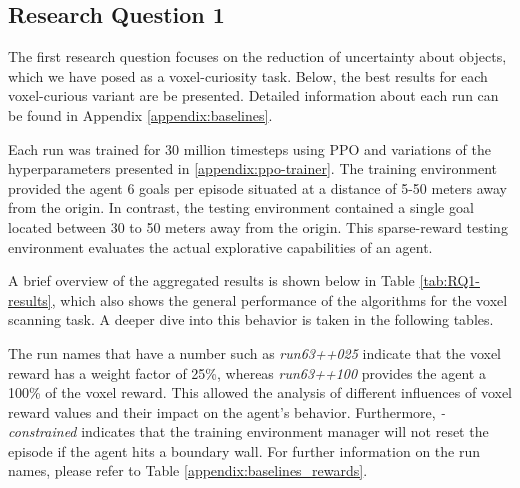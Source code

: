
\subsection{Research Question 1}\label{chap:4:results-RQ1}

The first research question focuses on the reduction of uncertainty about objects, which we have posed as a voxel-curiosity task. Below, the best results for each voxel-curious variant are be presented. Detailed information about each run can be found in Appendix \ref{appendix:baselines}.

Each run was trained for 30 million timesteps using PPO and variations of the hyperparameters presented in \ref{appendix:ppo-trainer}. The training environment provided the agent 6 goals per episode situated at a distance of 5-50 meters away from the origin. In contrast, the testing environment contained a single goal located between 30 to 50 meters away from the origin. This sparse-reward testing environment evaluates the actual explorative capabilities of an agent.

A brief overview of the aggregated results is shown below in Table \ref{tab:RQ1-results}, which also shows the general performance of the algorithms for the voxel scanning task. A deeper dive into this behavior is taken in the following tables.

The run names that have a number such as \textit{run63++025} indicate that the voxel reward has a weight factor of 25\%, whereas \textit{run63++100} provides the agent a 100\% of the voxel reward. This allowed the analysis of different influences of voxel reward values and their impact on the agent's behavior. Furthermore, \textit{-constrained} indicates that the training environment manager will not reset the episode if the agent hits a boundary wall. For further information on the run names, please refer to Table \ref{appendix:baselines_rewards}.

\newpage

